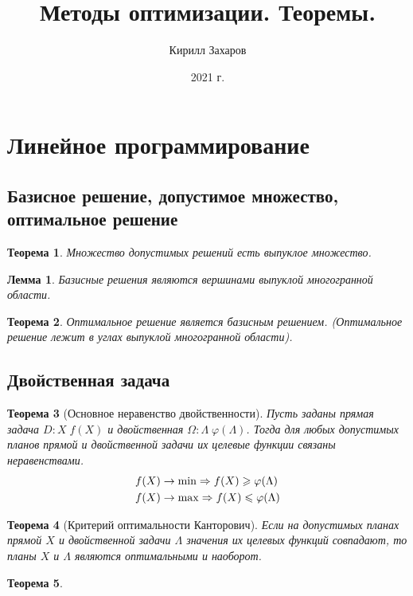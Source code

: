 \documentclass[12pt]{article}
\title{Методы оптимизации. Теоремы.}
\author{Кирилл Захаров}
\date{2021 г.}
\newtheorem{lemma}{Лемма}[subsection]
\newtheorem{theorem}{Теорема}[subsection]
\theoremstyle{definition}
\theoremstyle{remark}
\begin{document}
\maketitle
\tableofcontents

\section{Линейное программирование}
\subsection{Базисное решение, допустимое множество, оптимальное решение}

\begin{theorem}
  Множество допустимых решений есть выпуклое множество.
\end{theorem}
\begin{lemma}
  Базисные решения являются вершинами выпуклой многогранной области.
\end{lemma}
\begin{theorem}
  Оптимальное решение является базисным решением. (Оптимальное решение лежит в углах выпуклой многогранной области).
\end{theorem}
\subsection{Двойственная задача}

\begin{theorem}[Основное неравенство двойственности]
  Пусть заданы прямая задача $D: X\;f(X)$ и двойственная $\Omega :\Lambda\;\varphi(\Lambda)$. Тогда для любых допустимых планов прямой и двойственной задачи их целевые функции связаны неравенствами.
  \begin{align}
    &f(X)\to\min \Rightarrow f(X)\geqslant \varphi (\Lambda)\\
    &f(X)\to\max \Rightarrow f(X)\leqslant \varphi (\Lambda)\notag
  \end{align}
\end{theorem}
\begin{theorem}[Критерий оптимальности Канторович]
  Если на допустимых планах прямой  $X$ и двойственной задачи $\Lambda$ значения их целевых функций совпадают, то планы  $X$ и $\Lambda$ являются оптимальными и наоборот.
\end{theorem}
\begin{theorem}

\end{theorem}
\end{document}
